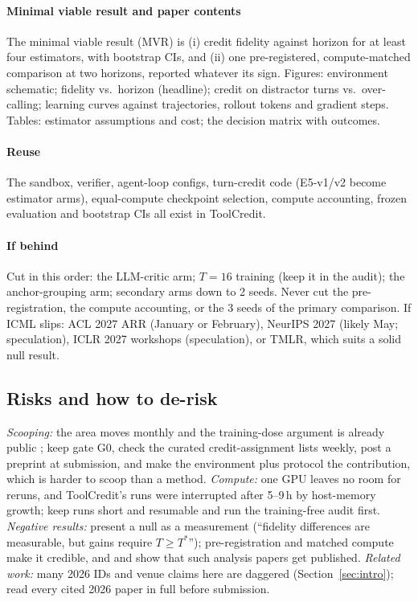 \paragraph{Minimal viable result and paper contents}
The minimal viable result (MVR) is (i) credit fidelity against horizon for at least four estimators, with bootstrap CIs, and (ii) one pre-registered, compute-matched comparison at two horizons, reported whatever its sign. Figures: environment schematic; fidelity vs.\ horizon (headline); credit on distractor turns vs.\ over-calling; learning curves against trajectories, rollout tokens and gradient steps. Tables: estimator assumptions and cost; the decision matrix with outcomes.

\paragraph{Reuse}
The sandbox, verifier, agent-loop configs, turn-credit code (E5-v1/v2 become estimator arms), equal-compute checkpoint selection, compute accounting, frozen evaluation and bootstrap CIs all exist in ToolCredit.

\paragraph{If behind}
Cut in this order: the LLM-critic arm; $T{=}16$ training (keep it in the audit); the anchor-grouping arm; secondary arms down to 2 seeds. Never cut the pre-registration, the compute accounting, or the 3 seeds of the primary comparison. If ICML slips: ACL 2027 ARR (January or February\unverified), NeurIPS 2027 (likely May; speculation), ICLR 2027 workshops (speculation), or TMLR, which suits a solid null result.

\subsection{Risks and how to de-risk}

\emph{Scooping:} the area moves monthly and the training-dose argument is already public \citep{zhang2026credit}; keep gate G0, check the curated credit-assignment lists weekly, post a preprint at submission, and make the environment plus protocol the contribution, which is harder to scoop than a method. \emph{Compute:} one GPU leaves no room for reruns, and ToolCredit's runs were interrupted after 5--9\,h by host-memory growth; keep runs short and resumable and run the training-free audit first. \emph{Negative results:} present a null as a measurement (``fidelity differences are measurable, but gains require $T\geq T^\ast$''); pre-registration and matched compute make it credible, and \citet{yue2025does} and \citet{zhang2026credit} show that such analysis papers get published. \emph{Related work:} many 2026 IDs and venue claims here are daggered (Section~\ref{sec:intro}); read every cited 2026 paper in full before submission.

